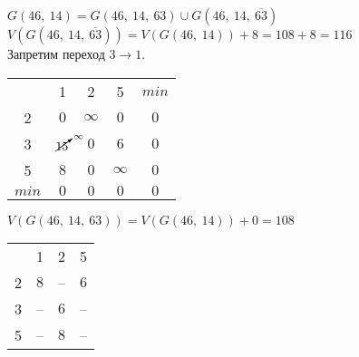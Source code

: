 \begin{itemize}
	$G(46,\ 14) = G(46,\ 14,\ 63) \cup G(46,\ 14,\ \overline{63})$\\
	$V(G(46,\ 14,\ \overline{63})) = V(G(46,\ 14)) + 8 = 108 + 8 = 116$\\
	Запретим переход $3 \rightarrow 1$.

	\begin{table}[H]
	\begin{center}
		\def\tabcolsep{18pt}
		\def\arraystretch{1.5}
		\fontsize{13}{14}\selectfont
		\begin{tabular}{|c||c|c|c||c|}
			\hline 
	  		& 1 & 2 & 5 & $min$\\ 
			\hhline{|=#=|=|=#=|} 
			2 & $0$ & $\infty$ & $0$ & $0$ \\ 
			\hline 
			3 & $\cancelto{\infty}{15}$ & $0$ & $6$ & $0$ \\ 
			\hline 
			5 & $8$ & $0$ & $\infty$ & $0$ \\
			\hhline{|=#=|=|=#=|}
			$min$ & $0$ & $0$ & $0$ & $0$ \\
			\hline
		\end{tabular}  
	\end{center}
	\end{table}

	$V(G(46,\ 14,\ 63)) = V(G(46,\ 14)) + 0 = 108$\\
	
\end{itemize}

\begin{table}[H]
\begin{center}
	\def\tabcolsep{18pt}
	\def\arraystretch{1.5}
	\fontsize{13}{14}\selectfont
	\begin{tabular}{|c||c|c|c|}
		\hline 
	  	& 1 & 2 & 5 \\ 
		\hhline{|=#=|=|=|} 
		2 & \cellcolor{pink} $8$ & -- & $6$ \\ 
		\hline 
		3 & -- & $6$ & -- \\ 
		\hline 
		5 & -- & \cellcolor{pink} $8$ & -- \\ 
		\hline 
	\end{tabular}  
\end{center}
\end{table}

